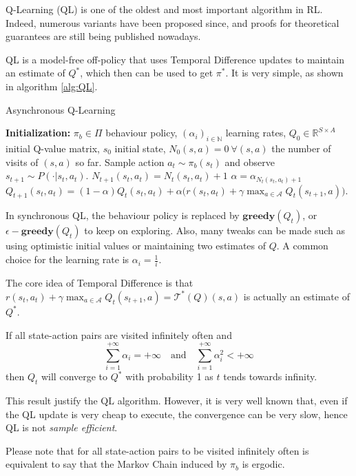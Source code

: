 Q-Learning (QL) is one of the oldest and most important algorithm in RL. Indeed, numerous variants have been proposed since, and proofs for theoretical guarantees are still being published nowadays.

QL is a model-free off-policy that uses Temporal Difference updates to maintain an estimate of $Q^*$, which then can be used to get $\pi^*$. It is very simple, as shown in algorithm \ref{alg:QL}.

\begin{algorithm}[htbp]
\small
\caption{Asynchronous Q-Learning}
\label{alg:QL}
\begin{algorithmic}
\State \textbf{Initialization:} $\pi_b \in \Pi$ behaviour policy, $(\alpha_i)_{i \in \mathbb{N}}$ learning rates, $Q_0 \in \mathbb{R}^{S \times A}$ initial Q-value matrix, $s_0$ initial state, $N_0(s,a) = 0 \ \forall (s,a)$ the number of visits of $(s,a)$ so far.
\State Sample action $a_t\sim \pi_b(s_t)$ and observe $s_{t+1}\sim P(\cdot\vert s_t,a_t)$.
\State $N_{t+1}(s_t,a_t)=N_t(s_t,a_t)+1$
\State $\alpha = \alpha_{N_t(s_t,a_t)+1}$
\State $Q_{t+1}(s_t,a_t)= (1-\alpha)Q_t(s_t,a_t)+\alpha\Big(r(s_t,a_t)+\gamma \max_{a\in\mathcal{A}}Q_t(s_{t+1},a)\Big)$.
\EndFor
\end{algorithmic}
\normalsize
\end{algorithm}

In synchronous QL, the behaviour policy is replaced by $\mathbf{greedy}(Q_t)$, or $\epsilon-\mathbf{greedy}(Q_t)$ to keep on exploring. Also, many tweaks can be made such as using optimistic initial values or maintaining two estimates of $Q$. A common choice for the learning rate is $\alpha_i = \frac{1}{i}$.

The core idea of Temporal Difference is that $r(s_t,a_t)+\gamma \max_{a\in\mathcal{A}}Q_t(s_{t+1},a) = \mathcal{T}^*(Q)(s,a)$ is actually an estimate of $Q^*$.

\begin{thm}\label{thm:QL-conv}
  If all state-action pairs are visited infinitely often and $$\sum_{i=1}^{+\infty}\alpha_i = +\infty \quad\text{and}\quad \sum_{i=1}^{+\infty}\alpha_i^2 < +\infty$$ then $Q_t$ will converge to $Q^*$ with probability 1 as $t$ tends towards infinity.
\end{thm}

This result justify the QL algorithm. However, it is very well known that, even if the QL update is very cheap to execute, the convergence can be very slow, hence QL is not \emph{sample efficient}.

Please note that for all state-action pairs to be visited infinitely often is equivalent to say that the Markov Chain induced by $\pi_b$ is ergodic.
